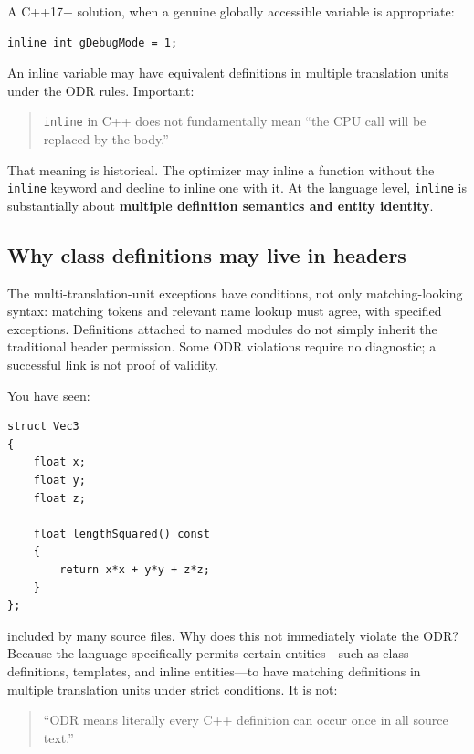 A C++17+ solution, when a genuine globally accessible variable is appropriate:

\begin{verbatim}
inline int gDebugMode = 1;
\end{verbatim}

An inline variable may have equivalent definitions in multiple translation units under the ODR rules. Important:

\begin{quote}
\texttt{inline} in C++ does not fundamentally mean ``the CPU call will be replaced by the body.''
\end{quote}

That meaning is historical. The optimizer may inline a function without the \texttt{inline} keyword and decline to inline one with it. At the language level, \texttt{inline} is substantially about \textbf{multiple definition semantics and entity identity}.

\subsection{Why class definitions may live in headers}\label{01-foundations-i-ch002-why-class-definitions-may-live-in-headers}

The multi-translation-unit exceptions have conditions, not only matching-looking syntax: matching tokens and relevant name lookup must agree, with specified exceptions. Definitions attached to named modules do not simply inherit the traditional header permission. Some ODR violations require no diagnostic; a successful link is not proof of validity.

You have seen:

\begin{verbatim}
struct Vec3
{
    float x;
    float y;
    float z;

    float lengthSquared() const
    {
        return x*x + y*y + z*z;
    }
};
\end{verbatim}

included by many source files. Why does this not immediately violate the ODR? Because the language specifically permits certain entities---such as class definitions, templates, and inline entities---to have matching definitions in multiple translation units under strict conditions. It is not:

\begin{quote}
``ODR means literally every C++ definition can occur once in all source text.''
\end{quote}

